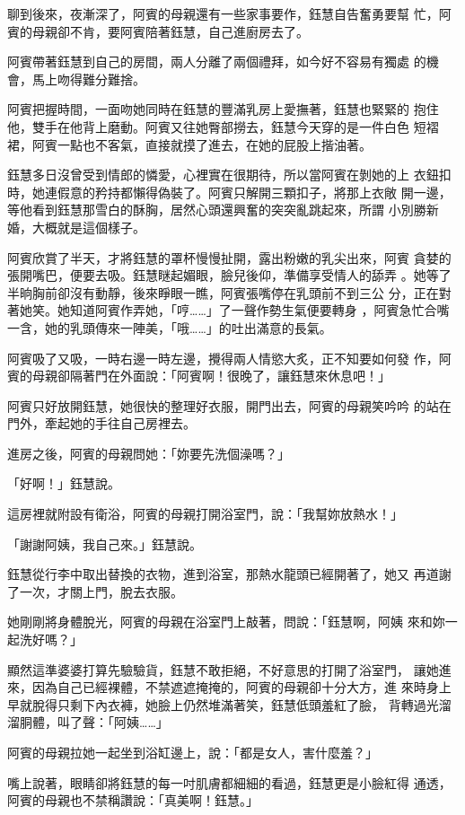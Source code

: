 聊到後來，夜漸深了，阿賓的母親還有一些家事要作，鈺慧自告奮勇要幫
忙，阿賓的母親卻不肯，要阿賓陪著鈺慧，自己進廚房去了。

阿賓帶著鈺慧到自己的房間，兩人分離了兩個禮拜，如今好不容易有獨處
的機會，馬上吻得難分難捨。

阿賓把握時間，一面吻她同時在鈺慧的豐滿乳房上愛撫著，鈺慧也緊緊的
抱住他，雙手在他背上磨動。阿賓又往她臀部撈去，鈺慧今天穿的是一件白色
短褶裙，阿賓一點也不客氣，直接就摸了進去，在她的屁股上揩油著。

鈺慧多日沒曾受到情郎的憐愛，心裡實在很期待，所以當阿賓在剝她的上
衣鈕扣時，她連假意的矜持都懶得偽裝了。阿賓只解開三顆扣子，將那上衣敞
開一邊，等他看到鈺慧那雪白的酥胸，居然心頭還興奮的突突亂跳起來，所謂
小別勝新婚，大概就是這個樣子。

阿賓欣賞了半天，才將鈺慧的罩杯慢慢扯開，露出粉嫩的乳尖出來，阿賓
貪婪的張開嘴巴，便要去吸。鈺慧瞇起媚眼，臉兒後仰，準備享受情人的舔弄
。她等了半晌胸前卻沒有動靜，後來睜眼一瞧，阿賓張嘴停在乳頭前不到三公
分，正在對著她笑。她知道阿賓作弄她，「哼……」了一聲作勢生氣便要轉身
，阿賓急忙合嘴一含，她的乳頭傳來一陣美，「哦……」的吐出滿意的長氣。

阿賓吸了又吸，一時右邊一時左邊，攪得兩人情慾大炙，正不知要如何發
作，阿賓的母親卻隔著門在外面說：「阿賓啊！很晚了，讓鈺慧來休息吧！」

阿賓只好放開鈺慧，她很快的整理好衣服，開門出去，阿賓的母親笑吟吟
的站在門外，牽起她的手往自己房裡去。

進房之後，阿賓的母親問她：「妳要先洗個澡嗎？」

「好啊！」鈺慧說。

這房裡就附設有衛浴，阿賓的母親打開浴室門，說：「我幫妳放熱水！」

「謝謝阿姨，我自己來。」鈺慧說。

鈺慧從行李中取出替換的衣物，進到浴室，那熱水龍頭已經開著了，她又
再道謝了一次，才關上門，脫去衣服。

她剛剛將身體脫光，阿賓的母親在浴室門上敲著，問說：「鈺慧啊，阿姨
來和妳一起洗好嗎？」

顯然這準婆婆打算先驗驗貨，鈺慧不敢拒絕，不好意思的打開了浴室門，
讓她進來，因為自己已經裸體，不禁遮遮掩掩的，阿賓的母親卻十分大方，進
來時身上早就脫得只剩下內衣褲，她臉上仍然堆滿著笑，鈺慧低頭羞紅了臉，
背轉過光溜溜胴體，叫了聲：「阿姨……」

阿賓的母親拉她一起坐到浴缸邊上，說：「都是女人，害什麼羞？」

嘴上說著，眼睛卻將鈺慧的每一吋肌膚都細細的看過，鈺慧更是小臉紅得
通透，阿賓的母親也不禁稱讚說：「真美啊！鈺慧。」

